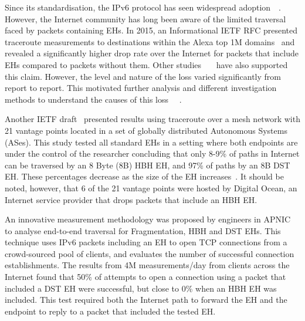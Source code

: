 \documentclass[conference]{IEEEtran}
\begin{document}
\label{sec:motivation}

Since its standardisation, the IPv6 protocol has seen
widespread adoption~\cite{v6adoption_ton}~\cite{google_stats}. However,
the Internet community has long been aware of the limited traversal faced
by packets containing EHs.  In 2015, an Informational IETF RFC presented
traceroute measurements to destinations within the Alexa top 1M
domains~\cite{RFC7872} and revealed a significantly higher drop rate over the Internet for
packets that include EHs compared to packets without them.
Other studies~\cite{james}~\cite{nalini-iepg114}~\cite{apnic} have also
supported this claim.  However, the level and nature of the loss varied
significantly from report to report. This motivated further analysis and
different investigation methods to understand the causes of this loss
~\cite{james}~\cite{elkins-v6ops-eh-deepdive-fw-01}.  

Another IETF draft~\cite{james} presented results using traceroute over a
mesh network with 21 vantage points located in a set of globally distributed
Autonomous Systems (ASes). This study tested all standard EHs in a setting
where both endpoints are under the control of the researcher concluding that
only 8-9\% of paths in Internet can be traversed by an 8 Byte (8B) HBH EH, and 97\% of paths by an 8B DST EH.  These percentages decrease as the
size of the EH increases~\cite{james-imc}. It should be noted, however, that 6
of the 21 vantage points were hosted by Digital Ocean\texttrademark, an
Internet service provider that drops packets that include an HBH EH.

An innovative measurement methodology was proposed by engineers in
APNIC~\cite{apnic} to analyse end-to-end traversal for Fragmentation, HBH and
DST EHs. This technique uses IPv6 packets
including an EH to open TCP connections from a crowd-sourced pool of clients, and evaluates the number of
successful connection establishments.  The results from 4M
measurements/day from clients across the Internet found that 50\%  of
attempts to open a connection using a packet that included a DST EH were successful, but close to 0\%
when an HBH EH was included.  This test
required both the Internet path to forward the EH and the endpoint to reply to
a packet that included the tested EH. 

\end{document}
